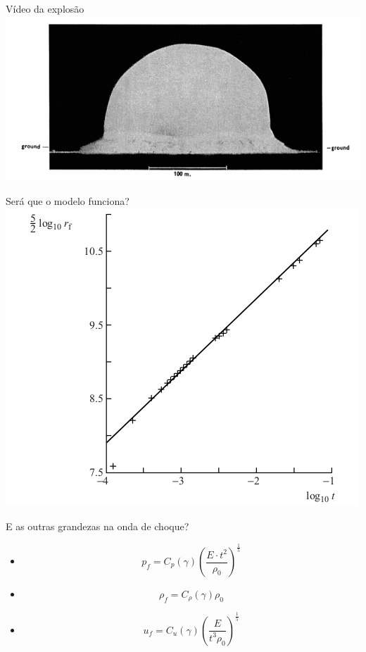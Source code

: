 \documentclass{beamer}
\begin{document}
\begin{frame}{Vídeo da explosão}
  \centering
  \includegraphics[width=\textwidth]{./figuras/explosao.png}
\end{frame}


\begin{frame}{Será que o modelo funciona?}
  \centering
  \includegraphics[height=0.95\textheight]{./figuras/explosao-raio.png}
\end{frame}

\begin{frame}{E as outras grandezas na onda de choque?}
  \begin{itemize}
  \item \[ p_f = C_p(\gamma) \left( \frac{E \cdot t^2}{\rho_0} \right)^\frac{1}{5} \]
  \item \[ \rho_f = C_\rho(\gamma) \rho_0 \]
  \item \[ u_f = C_u(\gamma)\left( \frac{E}{t^3\rho_0} \right)^\frac{1}{5} \]
  \end{itemize}

\end{frame}
\end{document}
